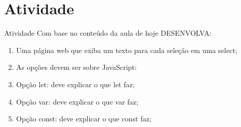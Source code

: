 \documentclass{beamer}
\begin{document}
\section{Atividade} 
\begin{frame}{Atividade}
	Com base no conteúdo da aula de hoje DESENVOLVA:
	\begin{enumerate}
	    \item  Uma página web que exiba um texto para cada seleção em uma select;
	    \item As opções devem ser sobre JavaScript:
	    \item Opção let: deve explicar o que let faz;
	    \item Opção var: deve explicar o que var faz;
	    \item Opção const: deve explicar o que const faz;
	\end{enumerate}
\end{frame}
\end{document}
